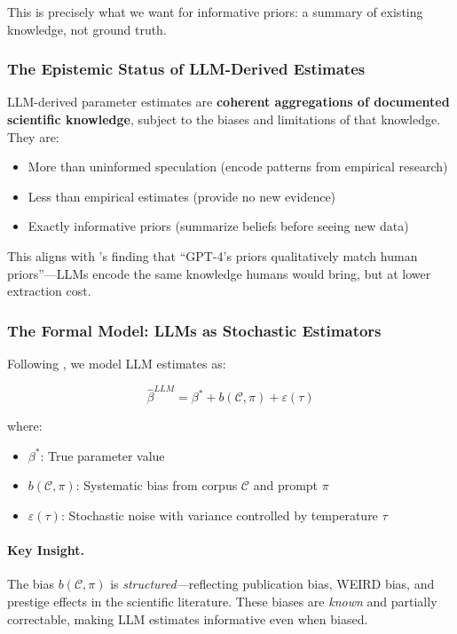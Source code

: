 This is precisely what we want for informative priors: a summary of existing knowledge, not ground truth.

\subsubsection{The Epistemic Status of LLM-Derived Estimates}

\begin{definition}
LLM-derived parameter estimates are \textbf{coherent aggregations of documented scientific knowledge}, subject to the biases and limitations of that knowledge. They are:
\begin{itemize}
    \item More than uninformed speculation (encode patterns from empirical research)
    \item Less than empirical estimates (provide no new evidence)
    \item Exactly informative priors (summarize beliefs before seeing new data)
\end{itemize}
\end{definition}

This aligns with \citet{zhu2024eliciting}'s finding that ``GPT-4's priors qualitatively match human priors''---LLMs encode the same knowledge humans would bring, but at lower extraction cost.

\subsubsection{The Formal Model: LLMs as Stochastic Estimators}

Following \citet{llmpriors2025scientific}, we model LLM estimates as:

\begin{equation}
\hat{\beta}^{LLM} = \beta^* + b(\mathcal{C}, \pi) + \varepsilon(\tau)
\label{eq:llm-estimator}
\end{equation}

where:
\begin{itemize}
    \item $\beta^*$: True parameter value
    \item $b(\mathcal{C}, \pi)$: Systematic bias from corpus $\mathcal{C}$ and prompt $\pi$
    \item $\varepsilon(\tau)$: Stochastic noise with variance controlled by temperature $\tau$
\end{itemize}

\paragraph{Key Insight.}
The bias $b(\mathcal{C}, \pi)$ is \textit{structured}---reflecting publication bias, WEIRD bias, and prestige effects in the scientific literature. These biases are \textit{known} and partially correctable, making LLM estimates informative even when biased.

